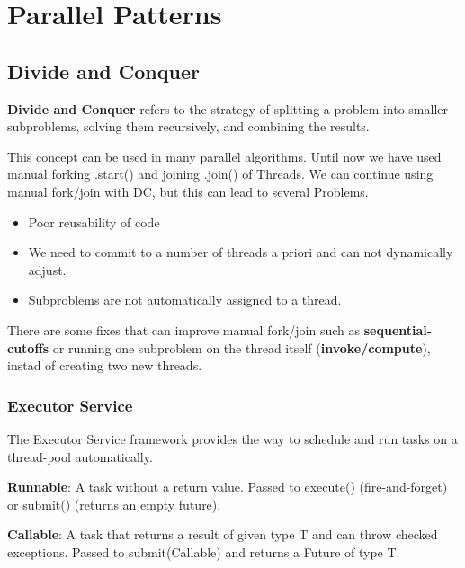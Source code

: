 \section{Parallel Patterns}

\subsection{Divide and Conquer}

\begin{definition}
    \textbf{Divide and Conquer } refers to the strategy of splitting a problem into smaller subproblems, solving them recursively, and combining the results.
\end{definition}

This concept can be used in many parallel algorithms. Until now we have used manual forking .start() and joining .join() of Threads. We can continue using manual fork/join with DC, but this can lead to several Problems.

\begin{itemize}
    \item Poor reusability of code
    \item We need to commit to a number of threads a priori and can not dynamically adjust.
    \item Subproblems are not automatically assigned to a thread.
\end{itemize}

\begin{remark}
    There are some fixes that can improve manual fork/join such as \textbf{sequential-cutoffs} or running one subproblem on the thread itself (\textbf{invoke/compute}), instad of creating two new threads.
\end{remark}

\subsubsection{Executor Service}

The Executor Service framework provides the way to schedule and run tasks on a thread-pool automatically.

\begin{definition}
    \textbf{Runnable}: A task without a return value. Passed to execute() (fire-and-forget) or submit() (returns an empty future).
\end{definition}

\begin{definition}
    \textbf{Callable}: A task that returns a result of given type T and can throw checked exceptions. Passed to submit(Callable) and returns a Future of type T.
\end{definition}

